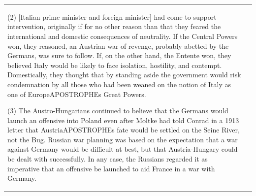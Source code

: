 {\begin{longtable}{p{}p{}}
(2) [Italian prime minister and foreign minister] had come to support intervention, originally if for no other reason than that they feared the international and domestic consequences of neutrality. If the Central Powers won, they reasoned, an Austrian war of revenge, probably abetted by the Germans, was sure to follow. If, on the other hand, the Entente won, they believed Italy would be likely to face isolation, hostility, and contempt. Domestically, they thought that by standing aside the government would risk condemnation by all those who had been weaned on the notion of Italy as one of EuropeAPOSTROPHEs Great Powers.

(3) The Austro-Hungarians continued to believe that the Germans would launch an offensive into Poland even after Moltke had told Conrad in a 1913 letter that AustriaAPOSTROPHEs fate would be settled on the Seine River, not the Bug. Russian war planning was based on the expectation that a war against Germany would be difficult at best, but that Austria-Hungary could be dealt with successfully. In any case, the Russians regarded it as imperative that an offensive be launched to aid France in a war with Germany.


\end{longtable}}
